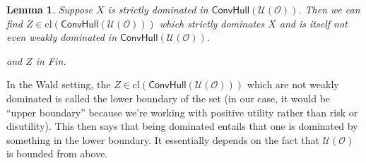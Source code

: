 \documentclass[a4paper]{article}
\newtheorem{lemma}[theorem]{Lemma}
\newcommand\cl{\mathrm{cl}}
\renewcommand\O{\mathcal{O}}
\newcommand\Uwald{\mathcal{U}} %
\newcommand{\todoold}[2][]{\todo[backgroundcolor=white,bordercolor=orange!10,linecolor=gray!10, #1,caption={},textcolor=gray]{Pre-rev: #2}}
\newcommand{\Conv}{\mathsf{ConvHull}}
\newenvironment{CCM rewritten}
{\begingroup\color{blue}} %
{\endgroup}              %
\begin{document}
	\begin{lemma}\label{thm:cct:dominator on boundry}
		Suppose $X$ is strictly  dominated in $\Conv(\Uwald(\O))$. Then we can find $Z\in\cl(\Conv(\Uwald(\O)))$ which strictly dominates $X$ and is itself not even weakly dominated in $\Conv(\Uwald(\O))$. \begin{infversion}
			and $Z$ in Fin.
		\end{infversion}
	\end{lemma}
	In the Wald setting, the $Z\in\cl(\Conv(\Uwald(\O)))$ which are not weakly dominated is called the lower boundary of the set (in our case, it would be ``upper boundary'' because we're working with positive utility rather than risk or disutility). This then says that being dominated entails that one is dominated by something in the lower boundary. It essentially depends on the fact that $\Uwald(\O)$ is bounded from above. 
	
\end{document}
